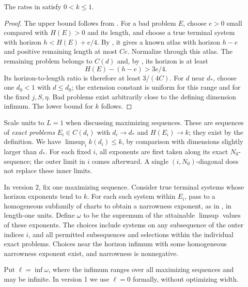 \begin{lemma}\label{a03:positive-rate}
The rates in  satisfy \(0<k\le1\).
\end{lemma}
\begin{proof}
The upper bound follows from .
For a bad problem \(E\), choose \(e>0\) small compared with \(H(E)>0\)
and its length, and choose a true terminal system with horizon
\(h<H(E)+e/4\).  By , it gives a known
atlas with horizon \(h-e\) and positive remaining length at most \(Ce\).
Normalize through this atlas.  The remaining problem belongs to \(C(d)\)
and, by , its horizon is at least
\begin{equation}
H(E)-(h-e)>3e/4.
\end{equation}
Its horizon-to-length ratio is therefore at least \(3/(4C)\).
For \(d\) near \(d_*\), choose one \(d_0<1\) with \(d\le d_0\);
the extension constant is uniform for this range and for the fixed
\(j,S,\eta\).  Bad problems exist arbitrarily close to the defining
dimension infimum.  The lower bound for \(k\) follows.
\end{proof}

Scale units to \(L=1\) when discussing maximizing sequences.  These
are sequences of \emph{exact problems} \(E_i\in C(d_i)\) with
\(d_i\to d_*\) and \(H(E_i)\to k\); they exist by the definition.
We have \(\limsup_i k(d_i)\le k\), by comparison with dimensions
slightly larger than \(d_*\).  For each fixed \(i\), all exponents
are first taken along its exact \(N_0\)-sequence; the outer limit
in \(i\) comes afterward.  A single \((i,N_0)\)-diagonal does not
replace these inner limits.

In version 2, fix one maximizing sequence.  Consider true terminal
systems whose horizon exponents tend to \(k\).  For each such system
within \(E_i\), pass to a homogeneous subfamily of charts to obtain
a narrowness exponent, as in , in length-one
units.  Define \(\omega\) to be the supremum of the attainable
\(\limsup\) values of these exponents.  The choices include systems
on any subsequence of the outer indices \(i\), and all permitted
subsequences and selections within the individual exact problems.
Choices near the horizon infimum with some homogeneous narrowness
exponent exist, and narrowness is nonnegative.

Put \(\ell=\inf\omega\), where the infimum ranges over all maximizing
sequences and may be infinite.  In version 1 we use \(\ell=0\)
formally, without optimizing width.

